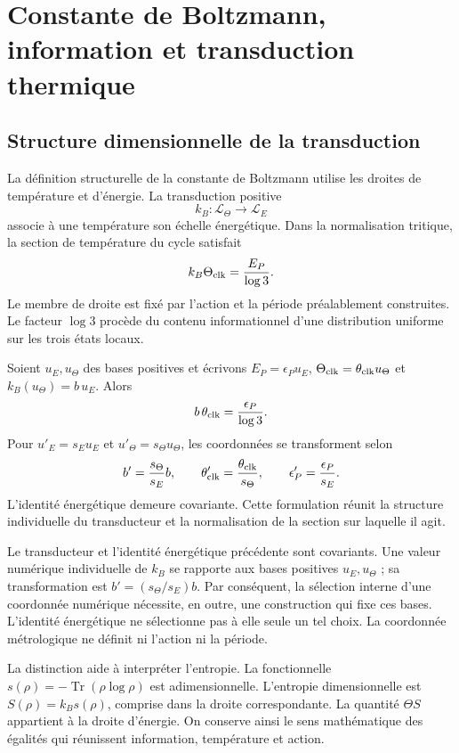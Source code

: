 \section{Constante de Boltzmann, information et transduction thermique}
\label{sec:ii-boltzmann}

\subsection{Structure dimensionnelle de la transduction}

La définition structurelle de la constante de Boltzmann utilise les
droites de température et d'énergie. La transduction positive
\[
 k_B:\mathcal L_\Theta\longrightarrow\mathcal L_E
\]
associe à une température son échelle énergétique. Dans la normalisation
tritique, la section de température du cycle satisfait
\[
 k_B\Theta_{\rm clk}=\frac{E_P}{\log3}.
\]
Le membre de droite est fixé par l'action et la période préalablement
construites. Le facteur \(\log3\) procède du contenu informationnel
d'une distribution uniforme sur les trois états locaux.

Soient \(u_E,u_\Theta\) des bases positives et écrivons
\(E_P=\epsilon_Pu_E\), \(\Theta_{\rm clk}=\theta_{\rm clk}u_\Theta\)
et \(k_B(u_\Theta)=b\,u_E\). Alors
\[
 b\,\theta_{\rm clk}=\frac{\epsilon_P}{\log3}.
\]
Pour \(u'_E=s_Eu_E\) et \(u'_\Theta=s_\Theta u_\Theta\),
les coordonnées se transforment selon
\[
 b'=\frac{s_\Theta}{s_E}b,\qquad
 \theta'_{\rm clk}=\frac{\theta_{\rm clk}}{s_\Theta},\qquad
 \epsilon'_P=\frac{\epsilon_P}{s_E}.
\]
L'identité énergétique demeure covariante. Cette formulation réunit
la structure individuelle du transducteur et la normalisation de la
section sur laquelle il agit.

\begin{remark}
Le transducteur et l’identité énergétique précédente sont covariants.
Une valeur numérique individuelle de \(k_B\) se rapporte aux bases positives
\(u_E,u_\Theta\) ; sa transformation est \(b'=(s_\Theta/s_E)b\).
Par conséquent, la sélection interne d’une coordonnée numérique nécessite,
en outre, une construction qui fixe ces bases. L’identité énergétique
ne sélectionne pas à elle seule un tel choix. La coordonnée métrologique
ne définit ni l’action ni la période.
\end{remark}

La distinction aide à interpréter l'entropie. La fonctionnelle
\(s(\rho)=-\operatorname{Tr}(\rho\log\rho)\) est adimensionnelle.
L'entropie dimensionnelle est \(S(\rho)=k_Bs(\rho)\), comprise dans
la droite correspondante. La quantité \(\Theta S\) appartient à
la droite d'énergie. On conserve ainsi le sens mathématique des
égalités qui réunissent information, température et action.

